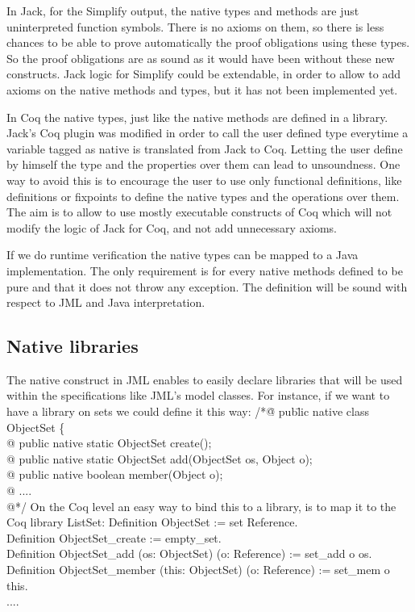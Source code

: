 In Jack, for the Simplify output, the native types and methods are 
just uninterpreted function symbols. There is no axioms on them,
 so there is less chances to be able to  prove automatically the 
proof obligations using these types. 
So the proof obligations are as sound as it would have been without these
new constructs. 
Jack logic for Simplify could be extendable, in order to allow to add 
axioms on the native methods and types, but it has not been implemented yet.

In Coq the native types, just like the native methods are defined in a library.
Jack's Coq plugin was modified in order to call the user defined type 
every\-time  a variable tagged as native is translated from Jack to Coq. 
Letting the user define by himself the type and the properties over them 
can lead to unsoundness. One way to avoid this is to encourage the user 
to use only functional definitions, like definitions or fixpoints to define 
the native types and the operations over them. 
 The aim is to allow to use mostly executable 
constructs of Coq which will not modify the logic of Jack for Coq, and not add
unnecessary axioms.

If we do runtime verification the native types can be mapped to a Java 
implementation. 
The only requirement is for every native methods defined to be pure and 
that it does not throw any exception. 
The definition will be sound with respect to JML and Java interpretation.


\subsection{Native libraries}
The native construct in JML enables to easily declare libraries 
that will be used within the specifications like JML's model classes. 
For instance, if we want to have a library on sets we could define it this way:
\btab
/*\=@ pub\=lic native class ObjectSet \{\+\\
  @\> public native static ObjectSet create();\\
   @\> public native static ObjectSet add(ObjectSet os, Object o);\\
   @\> public native boolean member(Object o);\\
   @ ....\\
   @*/
\etab
On the Coq level an easy way to bind this to a library, is to map it to the Coq library ListSet:
\btab
Definition ObjectSet := set Reference. \\
Definition ObjectSet\_create := empty\_set.\\
Definition ObjectSet\_add (os: ObjectSet) (o: Reference) :=  set\_add o os.\\
 Definition ObjectSet\_member (this: ObjectSet) (o: Reference) := set\_mem o this.\\
 ....
\etab

